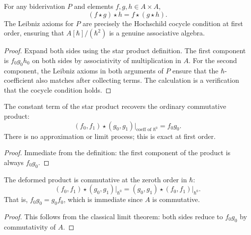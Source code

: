 \begin{theorem}
For any biderivation $P$ and elements $f, g, h \in A \times A$,
\[
(f \star g) \star h = f \star (g \star h) .
\]
The Leibniz axioms for $P$ are precisely the Hochschild cocycle condition at first order, ensuring that $A[\hbar]/(\hbar^2)$ is a genuine associative algebra.
\begin{proof}
Expand both sides using the star product definition. The first component is $f_0 g_0 h_0$ on both sides by associativity of multiplication in $A$. For the second component, the Leibniz axioms in both arguments of $P$ ensure that the $\hbar$-coefficient also matches after collecting terms. The calculation is a verification that the cocycle condition holds.
\end{proof}
\end{theorem}

\begin{theorem}
The constant term of the star product recovers the ordinary commutative product:
\[
(f_0, f_1) \star (g_0, g_1) \big|_{\text{coeff of } \hbar^0} = f_0 g_0 .
\]
There is no approximation or limit process; this is exact at first order.
\begin{proof}
Immediate from the definition: the first component of the product is always $f_0 g_0$.
\end{proof}
\end{theorem}

\begin{theorem}
The deformed product is commutative at the zeroth order in $\hbar$:
\[
(f_0, f_1) \star (g_0, g_1) \big|_{\hbar^0} = (g_0, g_1) \star (f_0, f_1) \big|_{\hbar^0} .
\]
That is, $f_0 g_0 = g_0 f_0$, which is immediate since $A$ is commutative.
\begin{proof}
This follows from the classical limit theorem: both sides reduce to $f_0 g_0$ by commutativity of $A$.
\end{proof}
\end{theorem}

